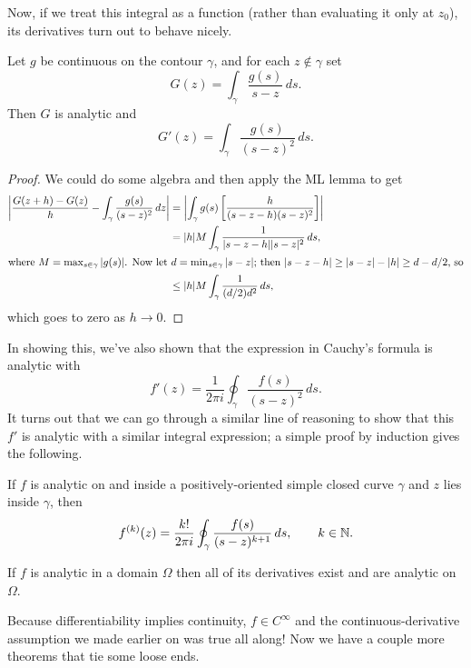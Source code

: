 \documentclass[../m136main.tex]{subfiles}
\begin{document}
Now, if we treat this integral as a function (rather than evaluating it only at $z_0$), its derivatives turn out to behave nicely.

\pagebreak

\begin{theorem}[]
    Let $g$ be continuous on the contour $\gamma$, and for each $z \notin \gamma$ set
    \[ G(z) = \int_\gamma \frac{g(s)}{s - z} \,ds. \]
    Then $G$ is analytic and
    \[ G'(z) = \int_\gamma \frac{g(s)}{(s-z)^2} \,ds. \]
\end{theorem}

\begin{proof}
    We could do some algebra and then apply the ML lemma to get
    \begin{align*}
        \left| \frac{G(z+h) - G(z)}{h} - \int_\gamma \frac{g(s)}{(s-z)^2} \,dz \right| &= \left| \int_\gamma g(s) \left[ \frac{h}{(s-z-h)(s-z)^2} \right] \right| \\
        &= |h| M \int_\gamma \frac{1}{|s-z-h| |s-z|^2} \,ds, \\
        \intertext{where $M = \max_{s \in \gamma} |g(s)|$. Now let $d = \min_{s \in \gamma} |s-z|$; then $|s-z - h| \geq |s-z| - |h| \geq d - d / 2$, so}
        &\leq |h| M \int_\gamma \frac{1}{(d / 2) d^2} \,ds, 
    \end{align*}
    which goes to zero as $h \to 0$.
\end{proof}

In showing this, we've also shown that the expression in Cauchy's formula is analytic with
\[ f'(z) = \frac{1}{2\pi i} \oint_\gamma \frac{f(s)}{(s-z)^2} \,ds. \]
It turns out that we can go through a similar line of reasoning to show that this $f'$ is analytic with a similar integral expression; a simple proof by induction gives the following.

\begin{theorem}
    If $f$ is analytic on and inside a positively-oriented simple closed curve $\gamma$ and $z$ lies inside $\gamma$, then
    \[ f^{(k)}(z) = \frac{k!}{2\pi i} \oint_\gamma \frac{f(s)}{(s-z)^{k+1}} \,ds, \qquad k \in \mathbb{N}. \]
\end{theorem}

\begin{corollary}[]
    If $f$ is analytic in a domain $\Omega$ then all of its derivatives exist and are analytic on $\Omega$.
\end{corollary}

Because differentiability implies continuity, $f \in C^\infty$ and the continuous-derivative assumption we made earlier on was true all along!      %
Now we have a couple more theorems that tie some loose ends.
\end{document}
